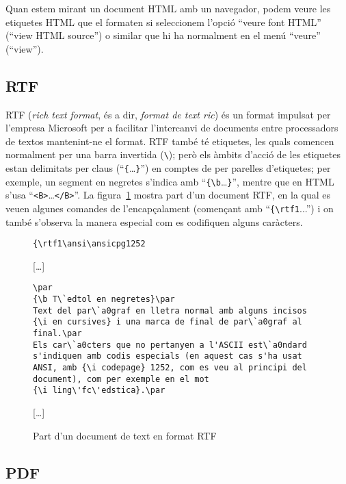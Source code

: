 Quan estem mirant un document HTML amb un navegador, podem veure les
etiquetes HTML que el formaten si seleccionem l'opció ``veure font
HTML'' (``view HTML source'') o similar que hi ha normalment en el menú ``veure''
(``view'').


\subsection{RTF}
\label{s3:RTF}

RTF (\emph{rich text format}, és a dir, \emph{format de text ric}) és
un format impulsat per l'empresa Microsoft per a facilitar
l'intercanvi de documents entre processadors de textos mantenint-ne el
format. RTF també té etiquetes, les quals comencen normalment per una
barra invertida (\verb+\+); però els àmbits d'acció de les etiquetes
estan delimitats per claus (``\verb+{+\ldots\verb+}+'') en comptes de
per parelles d'etiquetes; per exemple, un segment en negretes s'indica
amb ``\verb+{\b+\ldots\verb+}+'', mentre que en HTML s'usa
``\verb+<B>+\ldots\verb+</B>+''. La figura~\ref{fg:RTF} mostra part
d'un document RTF, en la qual es veuen algunes comandes de
l'encapçalament (començant amb ``\verb+{\rtf1+...'') i on també
  s'observa la manera especial com es codifiquen alguns caràcters.

\begin{figure}
\begin{center}
\begin{verbatim}
{\rtf1\ansi\ansicpg1252
\end{verbatim}
[\ldots]
\begin{verbatim}
\par
{\b T\`edtol en negretes}\par
Text del par\`a0graf en lletra normal amb alguns incisos 
{\i en cursives} i una marca de final de par\`a0graf al 
final.\par  
Els car\`a0cters que no pertanyen a l'ASCII est\`a0ndard 
s'indiquen amb codis especials (en aquest cas s'ha usat 
ANSI, amb {\i codepage} 1252, com es veu al principi del 
document), com per exemple en el mot 
{\i ling\'fc\'edstica}.\par
\end{verbatim}
[\ldots]
\end{center}
\caption{Part d'un document de text en format RTF}
\label{fg:RTF}
\end{figure}

\subsection{PDF}

